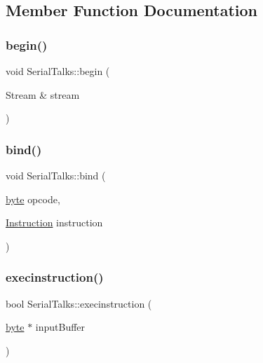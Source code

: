 \subsection{Member Function Documentation}
\mbox{\label{class_serial_talks_ad66e8c5cd4d3ae3e63f70884dba3ce12}} 
\subsubsection{\texorpdfstring{begin()}{begin()}}
{\footnotesize\ttfamily void Serial\+Talks\+::begin (\begin{DoxyParamCaption}\item[{Stream \&}]{stream }\end{DoxyParamCaption})}

\mbox{\label{class_serial_talks_a484c56fb8d8619a58435a001dca6f0ba}} 
\subsubsection{\texorpdfstring{bind()}{bind()}}
{\footnotesize\ttfamily void Serial\+Talks\+::bind (\begin{DoxyParamCaption}\item[{\hyperlink{serialutils_8h_a0c8186d9b9b7880309c27230bbb5e69d}{byte}}]{opcode,  }\item[{\hyperlink{class_serial_talks_a35ccf86c63ad45fb719e81b0c8db2f13}{Instruction}}]{instruction }\end{DoxyParamCaption})}

\mbox{\label{class_serial_talks_a31aac8c9995468cf9b1308264bc077ae}} 
\subsubsection{\texorpdfstring{execinstruction()}{execinstruction()}}
{\footnotesize\ttfamily bool Serial\+Talks\+::execinstruction (\begin{DoxyParamCaption}\item[{\hyperlink{serialutils_8h_a0c8186d9b9b7880309c27230bbb5e69d}{byte} $\ast$}]{input\+Buffer }\end{DoxyParamCaption})}

